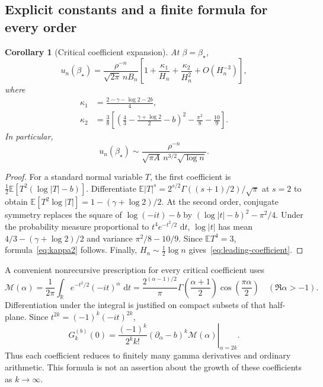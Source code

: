 \documentclass[11pt,a4paper]{article}
\numberwithin{equation}{section}
\newtheorem{corollary}[theorem]{Corollary}
\theoremstyle{definition}
\theoremstyle{remark}
\newcommand{\R}{\mathbb R}
\newcommand{\E}{\mathbb E}
\newcommand{\dd}{\,\mathrm d}
\newcommand{\bs}{\beta_\star}
\begin{document}
\subsection{Explicit constants and a finite formula for every order}
\begin{corollary}[Critical coefficient expansion]
\label{cor:critical-coeff}
At \(\beta=\bs\),
\begin{equation}
 u_n(\bs)=\frac{\rho^{-n}}{\sqrt{2\pi}\,nB_n}
 \left[1+\frac{\kappa_1}{H_n}+\frac{\kappa_2}{H_n^2}
 +O(H_n^{-3})\right],
 \label{eq:critical-coeff}
\end{equation}
where
\begin{align}
 \kappa_1&=\frac{2-\gamma-\log2-2b}{4},\label{eq:kappa1}\\
 \kappa_2&=\frac38\left[
 \left(\frac43-\frac{\gamma+\log2}{2}-b\right)^2
 -\frac{\pi^2}{8}-\frac{10}{9}\right].\label{eq:kappa2}
\end{align}
In particular,
\begin{equation}
 u_n(\bs)\sim\frac{\rho^{-n}}{\sqrt{\pi A}\,n^{3/2}\sqrt{\log n}}.
 \label{eq:leading-coefficient}
\end{equation}
\end{corollary}
\begin{proof}
For a standard normal variable \(T\), the first coefficient is
\(\tfrac12\E[T^2(\log|T|-b)]\). Differentiate
\(\E|T|^s=2^{s/2}\Gamma((s+1)/2)/\sqrt\pi\) at \(s=2\) to obtain
\(\E[T^2\log|T|]=1-(\gamma+\log2)/2\).
At the second order, conjugate symmetry replaces the square of
\(\log(-it)-b\) by \((\log|t|-b)^2-\pi^2/4\).
Under the probability measure proportional to \(t^4e^{-t^2/2}\,\dd t\),
\(\log|t|\) has mean
\(4/3-(\gamma+\log2)/2\) and variance \(\pi^2/8-10/9\).
Since \(\E T^4=3\), formula~\eqref{eq:kappa2} follows. Finally,
\(H_n\sim\tfrac12\log n\) gives~\eqref{eq:leading-coefficient}.
\end{proof}

A convenient nonrecursive prescription for every critical coefficient uses
\begin{equation}
 \mathcal M(\alpha)=\frac{1}{2\pi}
 \int_{\R}e^{-t^2/2}(-it)^\alpha\,\dd t
 =\frac{2^{(\alpha-1)/2}}{\pi}
 \Gamma\!\left(\frac{\alpha+1}{2}\right)
 \cos\!\left(\frac{\pi\alpha}{2}\right)
 \quad(\Re\alpha>-1).
 \label{eq:Mellin}
\end{equation}
Differentiation under the integral is justified on compact subsets of that
half-plane. Since \(t^{2k}=(-1)^k(-it)^{2k}\),
\begin{equation}
 G_k^{(b)}(0)=\left.
 \frac{(-1)^k}{2^k k!}(\partial_\alpha-b)^k\mathcal M(\alpha)
 \right|_{\alpha=2k}.
 \label{eq:all-coefficient-formula}
\end{equation}
Thus each coefficient reduces to finitely many gamma derivatives and
ordinary arithmetic. This formula is not an assertion about the growth of
these coefficients as \(k\to\infty\).
\end{document}

